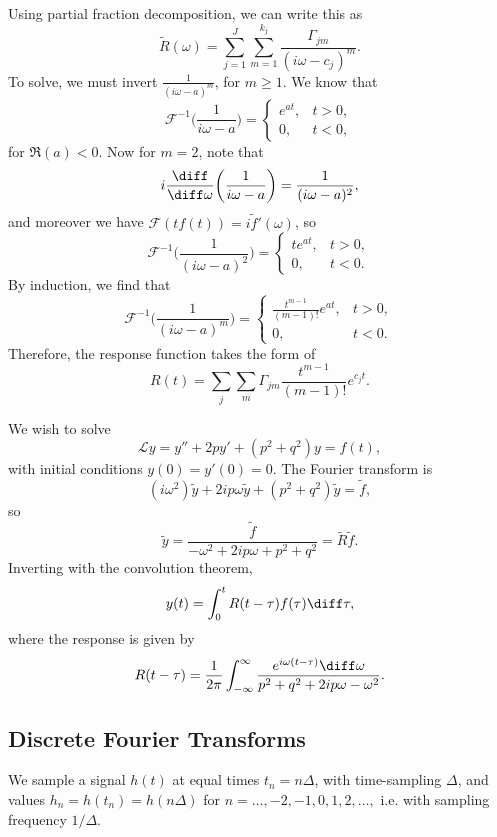 \documentclass[12pt]{article}
\begin{document}
Using partial fraction decomposition, we can write this as
\[
	\tilde R(\omega) = \sum_{j = 1}^{J} \sum_{m = 1}^{k_j} \frac{\Gamma_{jm}}{(i \omega - c_j)^{m}}
.\]
To solve, we must invert $\frac{1}{(i \omega - a)^{m}}$, for $m \geq 1$. We know that
\[
	\mathcal{F}^{-1} \biggl( \frac{1}{i\omega - a} \biggr) =
	\begin{cases}
		e^{at}, & t > 0, \\
		0, & t < 0,
	\end{cases}
\]
for $\Re(a) < 0$. Now for $m = 2$, note that
\[
	i \frac{\diff}{\diff \omega} \biggl( \frac{1}{i \omega - a} \biggr) = \frac{1}{(i \omega - a)^2}
,\]
and moreover we have $\mathcal{F}(tf(t)) = i \tilde f'(\omega)$, so
\[
	\mathcal{F}^{-1} \biggl( \frac{1}{(i \omega - a)^2} \biggr) =
	\begin{cases}
		t e^{at}, & t > 0, \\
		0, & t < 0.
	\end{cases}
\]
By induction, we find that
\[
	\mathcal{F}^{-1}\biggl( \frac{1}{(i \omega - a)^{m}}\biggr) =
	\begin{cases}
		\frac{t^{m-1}}{(m-1)!}e^{at}, & t > 0, \\
		0, & t < 0.
	\end{cases}
\]
Therefore, the response function takes the form of
\[
	R(t) = \sum_{j}\sum_{m} \Gamma_{jm} \frac{t^{m-1}}{(m-1)!}e^{c_j t}
.\]

\begin{exbox}
	We wish to solve
	\[
		\mathcal{L}y = y'' + 2 p y' + (p^2 + q^2)y = f(t)
	,\]
	with initial conditions $y(0) = y'(0) = 0$. The Fourier transform is
	\[
		(i \omega^2)\tilde y + 2 i p \omega \tilde y + (p^2 + q^2)\tilde y = \tilde f
	,\]
	so
	\[
	\tilde y = \frac{\tilde f}{- \omega^2 + 2 i p \omega + p^2 + q^2} = \tilde R \tilde f
	.\]
	Inverting with the convolution theorem,
	\[
		y(t) = \int_{0}^{t} R(t - \tau)f(\tau) \diff \tau
	,\]
	where the response is given by
	\[
		R(t - \tau) = \frac{1}{2\pi} \int_{-\infty}^{\infty} \frac{e^{i \omega(t - \tau)} \diff \omega}{p^2 + q^2 + 2 i p \omega - \omega^2}
	.\]
\end{exbox}

\subsection{Discrete Fourier Transforms}%
\label{sub:discrete_fourier_transforms}

We sample a signal $h(t)$ at equal times $t_n = n \Delta$, with time-sampling $\Delta$, and values $h_n = h(t_n) = h(n \Delta)$ for $n = \ldots, -2, -1, 0, 1, 2, \ldots,$ i.e. with sampling frequency $1/\Delta$.
\end{document}
